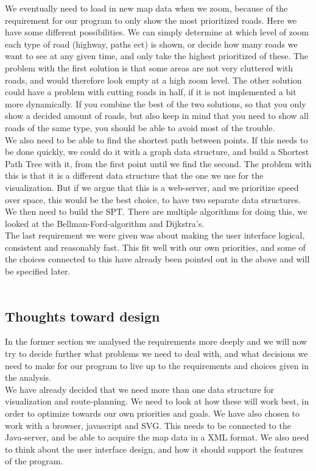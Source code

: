 \documentclass[a4paper,10pt,titlepage]{article}
\begin{document}
We eventually need to load in new map data when we zoom, because of the requirement for our program to only show the most prioritized roads. Here we have some different possibilities. We can simply determine at which level of zoom each type of road (highway, paths ect) is shown, or decide how many roads we want to see at any given time, and only take the highest prioritized of these. The problem with the first solution is that some areas are not very cluttered with roads, and would therefore look empty at a high zoom level. The other solution could have a problem with cutting roads in half, if it is not implemented a bit more dynamically. If you combine the best of the two solutions, so that you only show a decided amount of roads, but also keep in mind that you need to show all roads of the same type, you should be able to avoid most of the trouble.\\

We also need to be able to find the shortest path between points. If this needs to be done quickly, we could do it with a graph data structure, and build a Shortest Path Tree with it, from the first point until we find the second. The problem with this is that it is a different data structure that the one we use for the visualization. But if we argue that this is a web-server, and we prioritize speed over space, this would be the best choice, to have two separate data structures. We then need to build the SPT. There are multiple algorithms for doing this, we looked at the Bellman-Ford-algorithm and Dijkstra's.\\

The last requirement we were given was about making the user interface logical, consistent and reasonably fast. This fit well with our own priorities, and some of the choices connected to this have already been pointed out in the above and will be specified later.\\
\\

		
		\subsection{Thoughts toward design}
			In the former section we analysed the requirements more deeply and we will now try to decide further what problems we need to deal with, and what decisions we need to make for our program to live up to the requirements and choices given in the analysis.\\

We have already decided that we need more than one data structure for visualization and route-planning. We need to look at how these will work best, in order to optimize towards our own priorities and goals. We have also chosen to work with a browser, javascript and SVG. This needs to be connected to the Java-server, and be able to acquire the map data in a XML format. We also need to think about the user interface design, and how it should support the features of the program.\\
\end{document}
